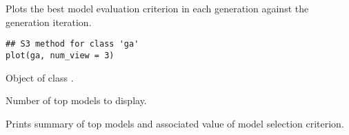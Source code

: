 %
\begin{Description}\relax
Plots the best model evaluation criterion in each generation
against the generation iteration.
\end{Description}
%
\begin{Usage}
\begin{verbatim}
## S3 method for class 'ga'
plot(ga, num_view = 3)
\end{verbatim}
\end{Usage}
%
\begin{Arguments}
\begin{ldescription}
\item[\code{ga}] Object of class .

\item[\code{num\_view}] Number of top models to display.
\end{ldescription}
\end{Arguments}
%
\begin{Value}
Prints summary of top models and associated value of
model selection criterion.
\end{Value}
